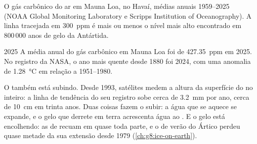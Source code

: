 \begin{omfigure}

{\small O gás carbônico do ar em Mauna Loa, no Havaí, médias anuais
1959--2025 (NOAA Global Monitoring Laboratory e Scripps Institution of
Oceanography). A linha tracejada em \qty{300}{ppm} é mais ou menos o
nível mais alto encontrado em 800\,000 anos de gelo da Antártida.}
\label{fig:g9:climate-past-and-present:co2}
\end{omfigure}

\begin{dated}{2025}
A média anual do gás carbônico em Mauna Loa foi de \qty{427.35}{ppm} em
2025. No registro da NASA, o ano mais quente desde 1880 foi 2024, com uma
anomalia de \qty{1.28}{\degreeCelsius} em relação a 1951--1980.
\end{dated}

O  também está subindo. Desde 1993, satélites medem a altura da
superfície do  no  inteiro: a linha de tendência do seu registro
sobe cerca de \qty{3.2}{mm} por ano, cerca de \qty{10}{cm} em trinta
anos. Duas coisas fazem o  subir: a água que se aquece se expande, e o
gelo que derrete em terra acrescenta água ao . E o gelo está
encolhendo: as  de  recuam em quase toda parte, e o  de verão do Ártico perdeu quase metade da sua extensão desde 1979
(\cref{ch:g8:ice-on-earth}).

